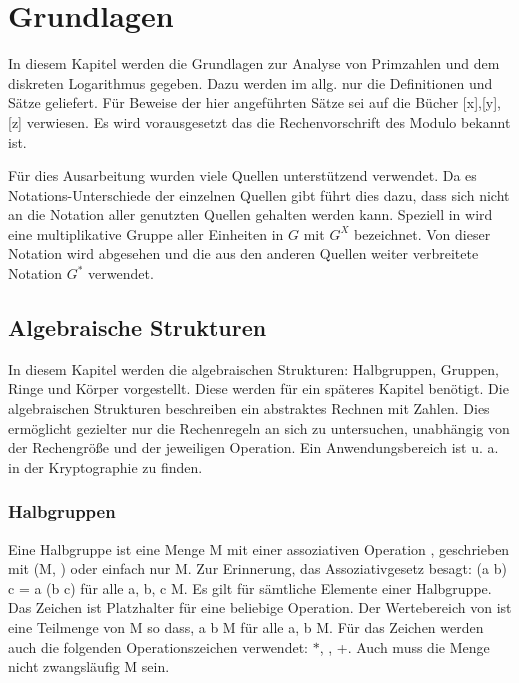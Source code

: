 \section{Grundlagen}
	In diesem Kapitel werden die Grundlagen zur Analyse von Primzahlen und dem diskreten Logarithmus gegeben. Dazu werden im allg. nur die Definitionen und Sätze geliefert. Für Beweise der hier angeführten Sätze sei auf die Bücher [x],[y],[z] verwiesen. Es wird vorausgesetzt das die Rechenvorschrift des Modulo bekannt ist.
	
	Für dies Ausarbeitung wurden viele Quellen unterstützend verwendet. Da es Notations-Unterschiede der einzelnen Quellen gibt führt dies dazu, dass sich nicht an die Notation aller genutzten Quellen gehalten werden kann. Speziell in \cite{Erste:Hilfe:in:Linearer:Algebra} wird eine multiplikative Gruppe aller Einheiten in $G$ mit $G^X$ bezeichnet. Von dieser Notation wird abgesehen und die aus den anderen Quellen weiter verbreitete Notation $G^*$ verwendet.
	
	\subsection{Algebraische Strukturen}
		In diesem Kapitel werden die algebraischen Strukturen: Halbgruppen, Gruppen, Ringe und Körper vorgestellt. Diese werden für ein späteres Kapitel benötigt. Die algebraischen Strukturen beschreiben ein abstraktes Rechnen mit Zahlen. Dies ermöglicht gezielter nur die Rechenregeln an sich zu untersuchen, unabhängig von der Rechengröße und der jeweiligen Operation. Ein Anwendungsbereich ist u. a. in der Kryptographie zu finden.~\cite{Kryptographie:und:Algorithmen}
	
		\subsubsection{Halbgruppen}
			Eine Halbgruppe ist eine Menge M mit einer assoziativen Operation \mycircOhne, geschrieben mit (M, \mycircOhne) oder einfach nur M. Zur Erinnerung, das Assoziativgesetz besagt: (a \mycirc b) \mycirc c = a \mycirc (b \mycirc c) für alle a, b, c \myin M. Es gilt für sämtliche Elemente einer Halbgruppe. Das Zeichen \mycirc ist Platzhalter für eine beliebige Operation. Der Wertebereich von \mycirc ist eine Teilmenge von M so dass, a \mycirc b \myin M für alle a, b \myin M. Für das Zeichen \mycirc werden auch die folgenden Operationszeichen verwendet: $*$, \mycdotOhne, +. Auch muss die Menge nicht zwangsläufig M sein.~\cite{Erste:Hilfe:in:Linearer:Algebra}
			
